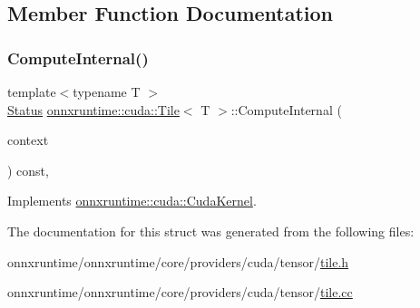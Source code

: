 \subsection{Member Function Documentation}
\mbox{\label{structonnxruntime_1_1cuda_1_1Tile_ad8a7d4e9aef2faec8891579f188ae6dd}} 
\subsubsection{\texorpdfstring{Compute\+Internal()}{ComputeInternal()}}
{\footnotesize\ttfamily template$<$typename T $>$ \\
\mbox{\hyperlink{classonnxruntime_1_1common_1_1Status}{Status}} \mbox{\hyperlink{structonnxruntime_1_1cuda_1_1Tile}{onnxruntime\+::cuda\+::\+Tile}}$<$ T $>$\+::Compute\+Internal (\begin{DoxyParamCaption}\item[{\mbox{\hyperlink{classonnxruntime_1_1OpKernelContext}{Op\+Kernel\+Context}} $\ast$}]{context }\end{DoxyParamCaption}) const\hspace{0.3cm}{\ttfamily [override]}, {\ttfamily [virtual]}}



Implements \mbox{\hyperlink{classonnxruntime_1_1cuda_1_1CudaKernel_aca7af04ae448017d6023d30bba231ebb}{onnxruntime\+::cuda\+::\+Cuda\+Kernel}}.



The documentation for this struct was generated from the following files\+:\begin{DoxyCompactItemize}
\item 
onnxruntime/onnxruntime/core/providers/cuda/tensor/\mbox{\hyperlink{cuda_2tensor_2tile_8h}{tile.\+h}}\item 
onnxruntime/onnxruntime/core/providers/cuda/tensor/\mbox{\hyperlink{cuda_2tensor_2tile_8cc}{tile.\+cc}}\end{DoxyCompactItemize}
